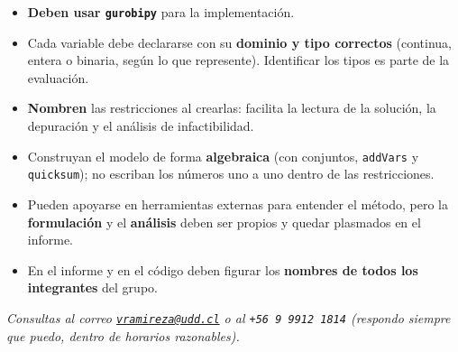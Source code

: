 \documentclass[12pt,a4paper]{article}
\begin{document}
\begin{itemize}[topsep=2pt]
    \item \textbf{Deben usar \texttt{gurobipy}} para la implementación.
    \item Cada variable debe declararse con su \textbf{dominio y tipo
          correctos} (continua, entera o binaria, según lo que represente).
          Identificar los tipos es parte de la evaluación.
    \item \textbf{Nombren} las restricciones al crearlas: facilita la lectura
          de la solución, la depuración y el análisis de infactibilidad.
    \item Construyan el modelo de forma \textbf{algebraica} (con conjuntos,
          \texttt{addVars} y \texttt{quicksum}); no escriban los números uno a
          uno dentro de las restricciones.
    \item Pueden apoyarse en herramientas externas para entender el método,
          pero la \textbf{formulación} y el \textbf{análisis} deben ser propios
          y quedar plasmados en el informe.
    \item En el informe y en el código deben figurar los \textbf{nombres de
          todos los integrantes} del grupo.
\end{itemize}

\vspace{1em}
\begin{center}
\textit{Consultas al correo
\href{mailto:vramireza@udd.cl}{\texttt{vramireza@udd.cl}} o al
\texttt{+56\,9\,9912\,1814}
(respondo siempre que puedo, dentro de horarios razonables).}
\end{center}

\end{document}
